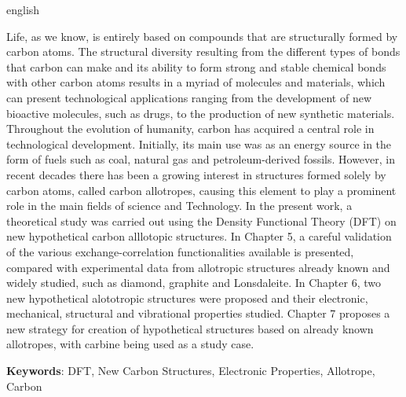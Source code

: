 \documentclass[
	12pt,				%
	openright,			%
	twoside,			%
	a4paper,			%
	chapter=TITLE,		%
	english,			%
	french,				%
	spanish,			%
	brazil				%
	]{abntex2}
\begin{document}
\begin{resumo}[Abstract]
 \begin{otherlanguage*}{english}
 	
   Life, as we know, is entirely based on compounds that are structurally formed by carbon atoms. The structural diversity resulting from the different types of bonds that carbon can make and its ability to form strong and stable chemical bonds with other carbon atoms results in a myriad of molecules and materials, which can present technological applications ranging from the development of new bioactive molecules, such as drugs, to the production of new synthetic materials.    
   Throughout the evolution of humanity, carbon has acquired a central role in technological development. Initially, its main use was as an energy source in the form of fuels such as coal, natural gas and petroleum-derived fossils. However, in recent decades there has been a growing interest in structures formed solely by carbon atoms, called carbon allotropes, causing this element to play a prominent role in the main fields of science and Technology.    
   In the present work, a theoretical study was carried out using the Density Functional Theory (DFT) on new hypothetical carbon alllotopic structures. In Chapter 5, a careful validation of the various exchange-correlation functionalities available is presented, compared with experimental data from allotropic structures already known and widely studied, such as diamond, graphite and Lonsdaleite. In Chapter 6, two new hypothetical alototropic structures were proposed and their electronic, mechanical, structural and vibrational properties studied. Chapter 7 proposes a new strategy for creation of hypothetical structures based on already known allotropes, with carbine being used as a study case. 
  
   \vspace{\onelineskip}
 
   \noindent 
   \textbf{Keywords}: DFT, New Carbon Structures, Electronic Properties, Allotrope, Carbon
 \end{otherlanguage*}
\end{resumo}

% 
\end{document}
